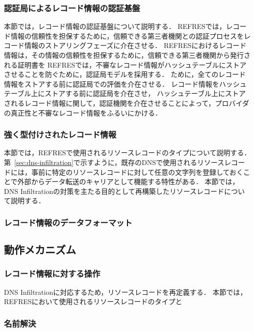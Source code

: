 


\subsubsection{認証局によるレコード情報の認証基盤}
本節では，レコード情報の認証基盤について説明する．
REFRESでは，レコード情報の信頼性を担保するために，信頼できる第三者機関との認証プロセスをレコード情報のストアリングフェーズに介在させる．
REFRESにおけるレコード情報は，その情報の信頼性を担保するために，信頼できる第三者機関から発行される証明書を
REFRESでは，不審なレコード情報がハッシュテーブルにストアさせることを防ぐために，認証局モデルを採用する．
ために，全てのレコード情報をストアする前に認証局での評価を介在させる．
レコード情報をハッシュテーブル上にストアする前に認証局を介在させ，
ハッシュテーブル上にストアされるレコード情報に関して，認証機関を介在させることによって，プロバイダの真正性と不審なレコード情報をふるいにかける．

\subsubsection{強く型付けされたレコード情報}
本節では，REFRESで使用されるリソースレコードのタイプについて説明する．
第~\ref{sec:dns-infiltration}で示すように，既存のDNSで使用されるリソースレコードには，事前に特定のリソースレコードに対して任意の文字列を登録しておくことで外部からデータ転送のキャリアとして機能する特性がある．
本節では，DNS Infiltrationの対策を主たる目的として再構築したリソースレコードについて説明する．



\subsubsection{レコード情報のデータフォーマット}

\subsection{動作メカニズム}
\subsubsection{レコード情報に対する操作}
DNS Infiltrationに対応するため，リソースレコードを再定義する．
本節では，REFRESにおいて使用されるリソースレコードのタイプと

\subsubsection{名前解決}
